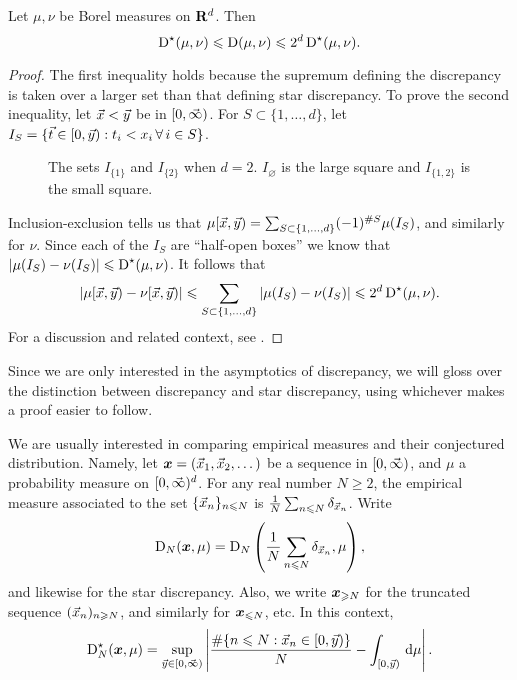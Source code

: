 \begin{lemma}
Let $\mu,\nu$ be Borel measures on $\mathbf{R}^d$. Then 
\[
	\operatorname{D}^\star(\mu,\nu) \leqslant \operatorname{D}(\mu,\nu) \leqslant 2^d \operatorname{D}^\star(\mu,\nu) .
\]
\end{lemma}
\begin{proof}
The first inequality holds because the supremum defining the discrepancy is 
taken over a larger set than that defining star discrepancy. To prove the 
second inequality, let $\vec{x}<\vec{y}$ be in $[0,\vec{\infty})$. For 
$S\subset \{1,\dots,d\}$, let 
$I_S = \{ \vec{t} \in [0,\vec{y}) : t_i < x_i \,\forall\,i\in S\}$.
\begin{figure}[h]
\caption{The sets $I_{\{1\}}$ and $I_{\{2\}}$ when $d = 2$. $I_\varnothing$ is 
the large square and $I_{\{1,2\}}$ is the small square.}
\centering
{}
\end{figure}
Inclusion-exclusion tells us that 
$\mu[\vec{x},\vec{y}) = \sum_{S\subset \{1,\dots,d\}} (-1)^{\# S} \mu(I_S)$, 
and similarly for $\nu$. Since each of the $I_S$ are ``half-open boxes'' 
we know that $|\mu(I_S) - \nu(I_S)| \leqslant \operatorname{D}^\star(\mu,\nu)$. It 
follows that 
\[
	|\mu[\vec{x},\vec{y}) - \nu[\vec{x},\vec{y})| \leqslant \sum_{S\subset \{1,\dots,d\}} |\mu(I_S) - \nu(I_S)| \leqslant 2^d \operatorname{D}^\star(\mu,\nu) .
\]
For a discussion and related context, see 
\cite[Ch.~2 Ex.~1.2]{kuipers-niederreiter-1974}. 
\end{proof}

Since we are only interested in the asymptotics of discrepancy, we will 
gloss over the distinction between discrepancy and star discrepancy, using 
whichever makes a proof easier to follow. 

We are usually interested in comparing empirical measures and their conjectured 
distribution. Namely, let ${\boldsymbol x} = (\vec{x}_1,\vec{x}_2,\dots)$ be a sequence in 
$[0,\vec{\infty})$, and $\mu$ a probability measure on $[0,\vec{\infty})^d$. For any real 
number $N\geqslant 2$, the empirical measure associated to the set 
$\{\vec{x}_n\}_{n\leqslant N}$ is 
$\frac{1}{N} \sum_{n\leqslant N} \delta_{\vec{x}_n}$. Write 
\[
	\operatorname{D}_N({\boldsymbol x},\mu) = \operatorname{D}_N\left( \frac{1}{N} \sum_{n\leqslant N} \delta_{\vec{x}_n},\mu\right) ,
\]
and likewise for the star discrepancy. Also, we write 
${\boldsymbol x}_{\geqslant N}$ for the truncated sequence 
$(\vec{x}_n)_{n\geqslant N}$, and similarly for ${\boldsymbol x}_{\leqslant N}$, etc. In this 
context, 
\[
	\operatorname{D}^\star_N({\boldsymbol x},\mu) = \sup_{\vec{y}\in [0,\vec{\infty})} \left| \frac{\# \{n\leqslant N : \vec{x}_n \in [0,\vec{y})\}}{N} - \int_{[0,\vec{y})} \, \mathrm{d}\mu\right| .
\]

